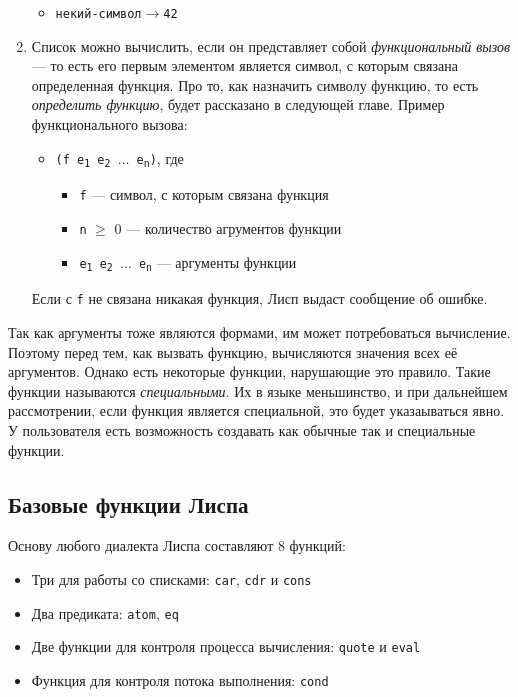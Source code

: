 \documentclass[a4paper, 12pt, titlepage, twoside]{article}
\begin{document}
\begin{enumerate}
\begin{itemize}
  \item[] \begin{alltt} некий-символ \(\longrightarrow\) 42\end{alltt}
  \end{itemize}
\item Список можно вычислить, если он представляет собой \textit{функциональный вызов} --- то есть его первым элементом является символ, с которым связана определенная функция. Про то, как назначить символу функцию, то есть \textit{определить функцию}, будет рассказано в следующей главе. Пример функционального вызова:
  \begin{itemize}
  \item[] \texttt{(f e\textsubscript{1} e\textsubscript{2} $\ldots$ e\textsubscript{n})}, где
    \begin{itemize}
    \item[] \verb|f| --- символ, с которым связана функция
    \item[] \verb|n| $\ge$ 0 --- количество агрументов функции
    \item[] \texttt{e\textsubscript{1} e\textsubscript{2} $\ldots$ e\textsubscript{n}} --- аргументы функции
    \end{itemize}
  \end{itemize}
  Если с \texttt{f} не связана никакая функция, Лисп выдаст сообщение об ошибке.
\end{enumerate}
Так как аргументы тоже являются формами, им может потребоваться вычисление. Поэтому перед тем, как вызвать функцию, вычисляются значения всех её аргументов. Однако есть некоторые функции, нарушающие это правило. Такие функции называются \textit{специальными}. Их в языке меньшинство, и при дальнейшем рассмотрении, если функция является специальной, это будет указаываться явно. У пользователя есть возможность создавать как обычные так и специальные функции.
\subsection{Базовые функции Лиспа}
Основу любого диалекта Лиспа составляют 8 функций:
\begin{itemize}
\item[] Три для работы со списками: \texttt{car}, \texttt{cdr} и \texttt{cons}
\item[] Два предиката: \texttt{atom}, \texttt{eq}
\item[] Две функции для контроля процесса вычисления: \texttt{quote} и \texttt{eval}
\item[] Функция для контроля потока выполнения: \texttt{cond}
\end{itemize}
\end{document}
